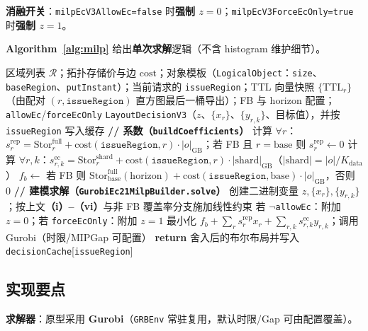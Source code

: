 \documentclass[conference]{IEEEtran}
\begin{document}
\textbf{消融开关}：\texttt{milpEcV3AllowEc=false} 时\textbf{强制 $z{=}0$}；\texttt{milpEcV3ForceEcOnly=true} 时\textbf{强制 $z{=}1$}。

\textbf{Algorithm~\ref{alg:milp}} 给出\textbf{单次求解}逻辑（不含 histogram 维护细节）。

\begin{algorithm}[t]
\caption{单次 MILP 求解流程（与原型代码对齐）}
\label{alg:milp}
\begin{algorithmic}[1]
\REQUIRE 区域列表 $\mathcal{R}$；拓扑存储价与边 $\mathrm{cost}$；对象模板（\texttt{LogicalObject}：\texttt{size}、\texttt{baseRegion}、\texttt{putInstant}）；当前请求的 \texttt{issueRegion}；TTL 向量快照 $\{\mathrm{TTL}_{r}\}$（由配对 $(r,\texttt{issueRegion})$ 直方图最后一桶导出）；FB 与 horizon 配置；\texttt{allowEc}/\texttt{forceEcOnly}
\ENSURE \texttt{LayoutDecisionV3}（$z$、$\{x_r\}$、$\{y_{r,k}\}$、目标值），并按 \texttt{issueRegion} 写入缓存
\STATE \textbf{// 系数（\texttt{buildCoefficients}）}
\STATE 计算 $\forall r$：$s^{\mathrm{rep}}_r{=}\mathrm{Stor}^{\mathrm{full}}_{r}+\mathrm{cost}(\texttt{issueRegion},r)\cdot\lvert o\rvert_{\mathrm{GB}}$；若 FB 且 $r{=}\mathrm{base}$ 则 $s^{\mathrm{rep}}_r{\leftarrow}0$
\STATE 计算 $\forall r,k$：$s^{\mathrm{ec}}_{r,k}{=}\mathrm{Stor}^{\mathrm{shard}}_{r}+\mathrm{cost}(\texttt{issueRegion},r)\cdot\lvert \mathrm{shard}\rvert_{\mathrm{GB}}$（$\lvert \mathrm{shard}\rvert{=}\lvert o\rvert/K_{\mathrm{data}}$）
\STATE $f_b \leftarrow$ 若 FB 则 $\mathrm{Stor}^{\mathrm{full}}_{\mathrm{base}}(\mathrm{horizon})+\mathrm{cost}(\texttt{issueRegion},\mathrm{base})\cdot\lvert o\rvert_{\mathrm{GB}}$，否则 $0$
\STATE \textbf{// 建模求解（\texttt{GurobiEc21MilpBuilder.solve}）}
\STATE 创建二进制变量 $z,\{x_r\},\{y_{r,k}\}$；按上文\textbf{（i）--（vi）}与非 FB 覆盖率分支施加线性约束
\STATE 若 $\neg$\texttt{allowEc}：附加 $z{=}0$；若 \texttt{forceEcOnly}：附加 $z{=}1$
\STATE 最小化 $f_b+\sum_r s^{\mathrm{rep}}_r x_r+\sum_{r,k}s^{\mathrm{ec}}_{r,k}y_{r,k}$；调用 Gurobi（时限/MIPGap 可配置）
\STATE \textbf{return} 舍入后的布尔布局并写入 \texttt{decisionCache}[\texttt{issueRegion}]
\end{algorithmic}
\end{algorithm}

\subsection{实现要点}
\textbf{求解器}：原型采用 \textbf{Gurobi}（\texttt{GRBEnv} 常驻复用，默认时限/Gap 可由配置覆盖）。
\end{document}
